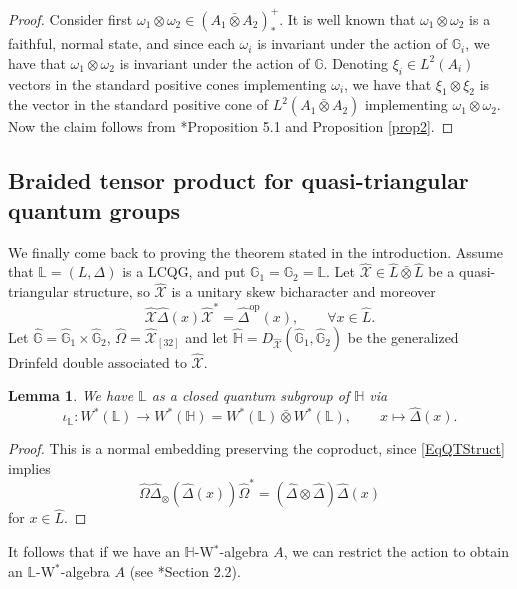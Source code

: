 \documentclass[reqno]{amsart}
\numberwithin{equation}{section}
\newtheorem{Lem}[Theorem]{Lemma}
\newcommand{\G}{\mathbb{G}}
\newcommand{\Ll}{\mathbb{L}}
\newcommand{\Hh}{\mathbb{H}}
\newcommand{\opp}{\mathrm{op}}
\newcommand{\mcX}{\mathcal{X}}
\newcommand{\mc}{\mathcal}
\newcommand{\wh}{\widehat}
\begin{document}
\begin{proof}
Consider first $\omega_1\otimes \omega_2\in (A_1\bar\otimes A_2)_*^+$. It is well known that $\omega_1\otimes \omega_2$ is a faithful, normal state, and since each $\omega_i$ is invariant under the action of $\G_i$, we have that $\omega_1\otimes \omega_2$ is invariant under the action of $\G$. Denoting $\xi_i\in L^2(A_i)$ vectors in the standard positive cones implementing $\omega_i$, we have that $\xi_1\otimes \xi_2$ is the vector in the standard positive cone of $L^2(A_1\bar{\otimes} A_2)$ implementing $\omega_1\otimes \omega_2$. Now the claim follows from \cite{DCKr24}*{Proposition 5.1} and Proposition \ref{prop2}.
\end{proof}

\subsection{Braided tensor product for quasi-triangular quantum groups}

We finally come back to proving the theorem stated in the introduction. Assume that $\Ll = (L,\Delta)$ is a LCQG, and put $\G_1 = \G_2 = \Ll$. Let $\wh{\mcX} \in \hat{L}\bar{\otimes}\hat{L}$ be a quasi-triangular structure, so $\wh{\mcX}$ is a unitary skew bicharacter and moreover 
\begin{equation}\label{EqQTStruct}
\wh{\mcX}\hat{\Delta}(x)\wh{\mcX}^* = \hat{\Delta}^{\opp}(x),\qquad \forall x\in \hat{L}. 
\end{equation}
Let $\hat{\G} =\hat{\G}_1\times \hat{\G}_2$, $\hat{\Omega}=\wh{\mc{X}}_{[32]}$ and let $\hat{\Hh} = D_{\wh{\mcX}}(\hat{\G}_1,\hat{\G}_2)$ be the generalized Drinfeld double associated to $\wh{\mcX}$.

\begin{Lem}
We have $\Ll$ as a closed quantum subgroup of $\Hh$ via
\[
\iota_{\Ll}\colon W^*(\Ll) \rightarrow W^*(\Hh) = W^*(\Ll)\bar{\otimes} W^*(\Ll),\qquad x\mapsto \hat{\Delta}(x). 
\]
\end{Lem} 
\begin{proof}
This is a normal embedding preserving the coproduct, since \eqref{EqQTStruct} implies
\[
\hat{\Omega}\hat{\Delta}_{\otimes}(\hat{\Delta}(x))\hat{\Omega}^* = (\hat{\Delta}\otimes \hat{\Delta})\hat{\Delta}(x)
\]
for $x\in \hat{L}$.
\end{proof}

It follows that if we have an $\Hh$-W$^*$-algebra $A$, we can restrict the action to obtain an $\Ll$-W$^*$-algebra $A$ (see \cite{DCKr24}*{Section 2.2}).
\end{document}
